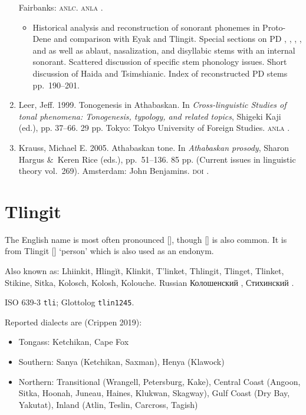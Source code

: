 \documentclass[12pt,letterpaper,oneside,article]{memoir}
\begin{document}
\begin{enumerate}
	Fairbanks: \textsc{anlc}.
	\textsc{anla} .
	\begin{itemize}
	\item	Historical analysis and reconstruction of sonorant phonemes in
		Proto-Dene and comparison with Eyak and Tlingit.
		Special sections on PD , , , ,
		and  as well as ablaut, nasalization, and disyllabic stems
		with an internal sonorant.
		Scattered discussion of specific stem phonology issues.
		Short discussion of Haida and Tsimshianic.
		Index of reconstructed PD stems pp.\ 190–201.
	\end{itemize}
\item	Leer, Jeff. 1999.
	Tonogenesis in Athabaskan.
	In \textit{Cross-linguistic Studies of tonal phenomena: Tonogenesis, typology,
		and related topics},
	Shigeki Kaji (ed.), pp. 37–66.
	29 pp.
	Tokyo: Tokyo University of Foreign Studies.
	\textsc{anla} .
\item	Krauss, Michael E.
	2005.
	Athabaskan tone.
	In \textit{Athabaskan prosody}, Sharon Hargus \&\ Keren Rice (eds.), pp.\ 51–136.
	85 pp.
	(Current issues in linguistic theory vol.\ 269).
	Amsterdam: John Benjamins.
	\textsc{doi} .
\end{enumerate}

\section{Tlingit}\label{sec:tlingit}

The English name  is most often pronounced [], though [] is also common. It is from Tlingit  [] ‘person’ which is also used as an endonym.

Also known as: Lhiinkit, Hlingĭt, Klinkit, T’linket, Thlingit, Tlinget, Tlinket, Stikine, Sitka, Kolosch, Kolosh, Kolouche. Russian Колошенский , Стихинский .

ISO 639-3 \texttt{tli}; Glottolog \texttt{tlin1245}.

Reported dialects are (Crippen 2019):
\begin{itemize}
\item	Tongass: Ketchikan, Cape Fox
\item	Southern: Sanya (Ketchikan, Saxman), Henya (Klawock)
\item	Northern: Transitional (Wrangell, Petersburg, Kake),
		Central Coast (Angoon, Sitka, Hoonah, Juneau, Haines, Klukwan, Skagway),
		Gulf Coast (Dry Bay, Yakutat),
		Inland (Atlin, Teslin, Carcross, Tagish)
\end{itemize}
\end{document}

